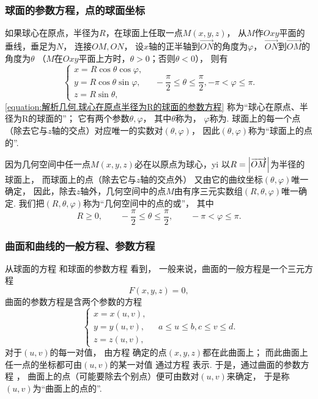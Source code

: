 \subsubsection{球面的参数方程，点的球面坐标}
如果球心在原点，半径为\(R\)，在球面上任取一点\(M(x,y,z)\)，
从\(M\)作\(Oxy\)平面的垂线，垂足为\(N\)，
连接\(OM,ON\)，
设\(x\)轴的正半轴到\(\vec{ON}\)的角度为\(\varphi\)，
\(\vec{ON}\)到\(\vec{OM}\)的角度为\(\theta\)
（\(M\)在\(Oxy\)平面上方时，\(\theta>0\)；否则\(\theta<0\)），
则有
\begin{equation}\label{equation:解析几何.球心在原点半径为R的球面的参数方程}
	\left\{ \begin{array}{l}
		x = R \cos\theta \cos\varphi, \\
		y = R \cos\theta \sin\varphi, \\
		z = R \sin\theta,
	\end{array} \right.
	\quad
	-\frac{\pi}{2} \leqslant \theta \leqslant \frac{\pi}{2},
	-\pi < \varphi \leqslant \pi.
\end{equation}
\cref{equation:解析几何.球心在原点半径为R的球面的参数方程}
称为“球心在原点、半径为R的球面的”；
它有两个参数\(\theta,\varphi\)，
其中\(\theta\)称为，
\(\varphi\)称为.
球面上的每一个点（除去它与\(z\)轴的交点）对应唯一的实数对\((\theta,\varphi)\)，
因此\((\theta,\varphi)\)称为“球面上的点的”.

因为几何空间中任一点\(M(x,y,z)\)必在以原点为球心，yi
以\(R=\abs{\overrightarrow{OM}}\)为半径的球面上，
而球面上的点（除去它与\(z\)轴的交点外）
又由它的曲纹坐标\((\theta,\varphi)\)唯一确定，
因此，除去\(z\)轴外，几何空间中的点\(M\)由有序三元实数组\((R,\theta,\varphi)\)唯一确定.
我们把\((R,\theta,\varphi)\)称为“几何空间中的点的或”，
其中\[
	R \geqslant 0,
	\qquad
	-\frac{\pi}{2} \leqslant \theta \leqslant \frac{\pi}{2},
	\qquad
	-\pi < \varphi \leqslant \pi.
\]

\subsubsection{曲面和曲线的一般方程、参数方程}
从球面的方程 
和球面的参数方程  看到，
一般来说，曲面的一般方程是一个三元方程\[
	F(x,y,z) = 0,
\]
曲面的参数方程是含两个参数的方程
\begin{equation}\label{equation:解析几何.曲面的参数方程}
	\left\{ \begin{array}{l}
		x = x(u,v), \\
		y = y(u,v), \\
		z = z(u,v),
	\end{array} \right.
	\quad
	a \leqslant u \leqslant b,
	c \leqslant v \leqslant d.
\end{equation}
对于\((u,v)\)的每一对值，
由方程  确定的点\((x,y,z)\)都在此曲面上；
而此曲面上任一点的坐标都可由\((u,v)\)的某一对值
通过方程  表示.
于是，通过曲面的参数方程 ，
曲面上的点（可能要除去个别点）便可由数对\((u,v)\)来确定，
于是称\((u,v)\)为“曲面上的点的”.

